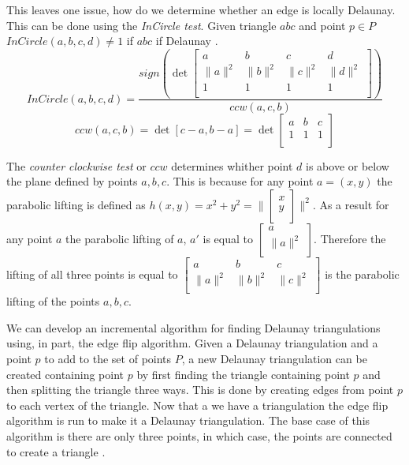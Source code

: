 \documentclass[11pt]{article}
\theoremstyle{definition}
\begin{document}
	This leaves one issue, how do we determine whether an edge is locally Delaunay. 
	This can be done using the \emph{InCircle test}. 
	Given triangle $abc$ and point $p \in P$ $InCircle(a,b,c,d) \neq 1$ if $abc$ if Delaunay \cite{princeton:CCW}. 
	\begin{equation}
		InCircle(a,b,c,d) = \frac{sign(\det
		\begin{bmatrix}
    			a & b & c & d \\
    			\|a\|^2 & \|b\|^2 & \|c\|^2 & \|d\|^2 \\
    			1 & 1 & 1 & 1 \\
		\end{bmatrix} 
		)}{ccw(a,c,b)}
	\end{equation}
	\begin{equation}
		ccw(a,c,b) = \det[c-a,b-a] = \det
		\begin{bmatrix}
    			a & b & c \\
    			1 & 1 & 1\\
		\end{bmatrix} 
	\end{equation} 
	
	The \emph{counter clockwise test} or $ccw$ determines whither point $d$ is above or below the plane defined by points $a,b,c$. 
	This is because for any point $a = (x,y)$ the parabolic lifting is defined as $h(x,y) = x^2 + y^2 = \| 
	\begin{bmatrix} 
		x \\
		y \\ 
	\end{bmatrix} 
	\|^2$.
	As a result for any point $a$ the parabolic lifting of $a$, $a'$ is equal to $
	\begin{bmatrix} 
		a \\ 
		\| a \|^2 \\ 
	\end{bmatrix}$. 
	Therefore the lifting of all three points is equal to
	$\begin{bmatrix}
    			a & b & c \\
    			\|a\|^2 & \|b\|^2 & \|c\|^2 \\
	\end{bmatrix}$ 
	is the parabolic lifting of the points $a,b,c$.

	We can develop an incremental algorithm for finding Delaunay triangulations using, in part, the edge flip algorithm.
	Given a Delaunay triangulation and a point $p$ to add to the set of points $P$, a new Delaunay triangulation can be created containing point $p$ by first finding the triangle containing point $p$ and then splitting the triangle three ways. 
	This is done by creating edges from point $p$ to each vertex of the triangle. 
	Now that a we have a triangulation the edge flip algorithm is run to make it a Delaunay triangulation. 
	The base case of this algorithm is there are only three points, in which case, the points are connected to create a triangle \cite{meshGeneration}. 
\end{document}
